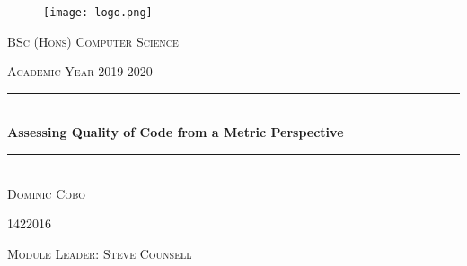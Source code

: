 \documentclass[a4paper, 10pt]{report}
\newcommand{\fypCourse}{BSc (Hons) Computer Science}
\newcommand{\fypStudent}{Dominic Cobo}
\newcommand{\fypStudentId}{1422016}
\newcommand{\moduleLeader}{Steve Counsell}
\newcommand{\fypAcademicYear}{2019-2020}
\newcommand{\fypTitle}{Assessing Quality of Code from a Metric Perspective}
\begin{document}
	\begin{titlepage}
		\centering
		\begin{figure}
			\texttt{[image: logo.png]}
		\end{figure}
		\textsc{\LARGE \fypCourse}
		
		\textsc{\large Academic Year \fypAcademicYear}
		
		\rule{\linewidth}{0.5mm} \\[0.5cm]
		{ \huge\textbf { \fypTitle } } \\
		\rule{\linewidth}{0.5mm} \\[6cm]
		
		
		\textsc{\huge \fypStudent}
		
		\textsc{\large \fypStudentId}
		
		\bigskip
		
		\textsc{\large Module Leader: \moduleLeader}
		
		\bigskip
		
	\end{titlepage}
	
	\newpage
	
	
	
	
	
	

	\printbibliography
	
\end{document}
